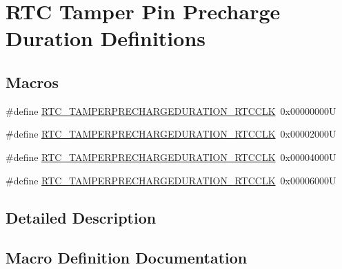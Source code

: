 \hypertarget{group___r_t_c_ex___tamper___pin___precharge___duration___definitions}{}\section{R\+TC Tamper Pin Precharge Duration Definitions}
\label{group___r_t_c_ex___tamper___pin___precharge___duration___definitions}
\subsection*{Macros}
\begin{DoxyCompactItemize}
\item 
\#define \hyperlink{group___r_t_c_ex___tamper___pin___precharge___duration___definitions_gac2a79623b1690b2e5893e6b53dad3480}{R\+T\+C\+\_\+\+T\+A\+M\+P\+E\+R\+P\+R\+E\+C\+H\+A\+R\+G\+E\+D\+U\+R\+A\+T\+I\+O\+N\+\_\+R\+T\+C\+C\+LK}~0x00000000U
\item 
\#define \hyperlink{group___r_t_c_ex___tamper___pin___precharge___duration___definitions_ga270be6ced6bafda4a94e5624a0bc3eab}{R\+T\+C\+\_\+\+T\+A\+M\+P\+E\+R\+P\+R\+E\+C\+H\+A\+R\+G\+E\+D\+U\+R\+A\+T\+I\+O\+N\+\_\+R\+T\+C\+C\+LK}~0x00002000U
\item 
\#define \hyperlink{group___r_t_c_ex___tamper___pin___precharge___duration___definitions_ga12497acabf044c2d1de7d735efdb2efc}{R\+T\+C\+\_\+\+T\+A\+M\+P\+E\+R\+P\+R\+E\+C\+H\+A\+R\+G\+E\+D\+U\+R\+A\+T\+I\+O\+N\+\_\+R\+T\+C\+C\+LK}~0x00004000U
\item 
\#define \hyperlink{group___r_t_c_ex___tamper___pin___precharge___duration___definitions_ga353fca64c5b0e927ab024ed13a526e09}{R\+T\+C\+\_\+\+T\+A\+M\+P\+E\+R\+P\+R\+E\+C\+H\+A\+R\+G\+E\+D\+U\+R\+A\+T\+I\+O\+N\+\_\+R\+T\+C\+C\+LK}~0x00006000U
\end{DoxyCompactItemize}


\subsection{Detailed Description}


\subsection{Macro Definition Documentation}
\mbox{\label{group___r_t_c_ex___tamper___pin___precharge___duration___definitions_gac2a79623b1690b2e5893e6b53dad3480}} 
